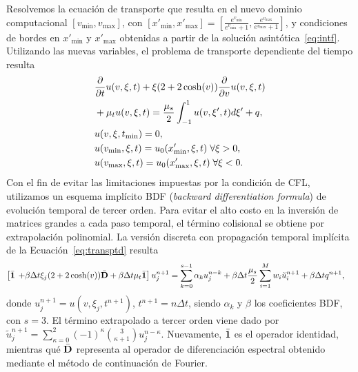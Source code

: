 Resolvemos la ecuación de transporte que resulta en el nuevo dominio computacional
$[v_{\text{min}},v_{\text{max}}]$, con 
$[x'_{\text{min}},x'_{\text{max}}]=[\frac{e^{v_{\text{min}}}}{e^{v_{\text{min}}}+1},
\frac{e^{v_{\text{max}}}}{e^{v_{\text{max}}}+1}]$, 
y condiciones de bordes en $x'_{\text{min}}$ y $x'_{\text{max}}$ 
obtenidas a partir de la solución asintótica~\eqref{eq:intf}. Utilizando las nuevas variables, 
el problema de transporte dependiente del tiempo resulta 
\begin{equation}
\begin{split}
&\frac{\partial}{\partial t}u(v,\xi,t)+\xi(2+2\cosh(v)) \frac{\partial}{\partial v}u(v,\xi,t)\\
&+\mu_tu(v,\xi,t)=\frac{\mu_s}{2} \int_{-1}^{1} u(v,\xi',t) d\xi'+q, \\
&u(v,\xi,t_{\text{min}})=0,\\
&u(v_{\text{min}},\xi,t)=u_{0}(x'_{\text{min}},\xi,t) \; \forall \xi>0,\\
&u(v_{\text{max}},\xi,t)=u_{0}(x'_{\text{max}},\xi,t) \; \forall \xi<0.
\end{split}
\label{eq:transptd}
\end{equation}
Con el fin de evitar las
limitaciones impuestas por la condición de CFL, utilizamos un 
esquema implícito BDF ({\em backward differentiation formula}) de evolución temporal de tercer orden. 
Para evitar el alto costo en la inversión de matrices grandes a 
cada paso temporal, el término 
colisional se obtiene por extrapolación polinomial. La versión discreta con propagación temporal 
implícita de la Ecuación~\eqref{eq:transptd} resulta
\begin{equation*}
\begin{aligned}
 \left[ \bar{\mathbf{1}} \right. & \left.+ \beta\Delta t\xi_j (2+2\cosh(v)) \bar{\mathbf{D}} + \beta\Delta t \mu_t \bar{\mathbf{1}} \right]  
 u^{n+1}_j  = 
\sum_{k=0}^{s-1}\alpha_k u_j^{n-k} + \beta\Delta t \frac{\mu_s}{2}
 \sum_{i=1}^{M} w_i \tilde{u}_i^{n+1} + \beta\Delta t q^{n+1},
\end{aligned}
\label{eq:transptd1disc}
\end{equation*}
donde $u^{n+1}_j=u(v,\xi_j,t^{n+1})$, $t^{n+1}=n\Delta t$, siendo $\alpha_k$ y $\beta$ 
los coeficientes BDF, con $s=3$. El término extrapolado 
a tercer orden viene dado por $\tilde{u}_j^{n+1}=\sum_{\kappa=0}^{2}(-1)^\kappa {3 \choose \kappa+1} u_j^{n-\kappa}$. Nuevamente, 
$\bar{\mathbf{1}}$ es el operador identidad, mientras qué $\bar{\mathbf{D}}$ representa al operador 
de diferenciación espectral obtenido mediante el método de continuación de Fourier. 

